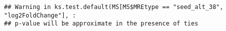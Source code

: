 \documentclass[
]{article}
\newenvironment{Shaded}{\begin{snugshade}}{\end{snugshade}}
\newcommand{\FunctionTok}[1]{\textcolor[rgb]{0.13,0.29,0.53}{\textbf{#1}}}
\newcommand{\NormalTok}[1]{#1}
\newcommand{\OtherTok}[1]{\textcolor[rgb]{0.56,0.35,0.01}{#1}}
\newcommand{\SpecialCharTok}[1]{\textcolor[rgb]{0.81,0.36,0.00}{\textbf{#1}}}
\newcommand{\StringTok}[1]{\textcolor[rgb]{0.31,0.60,0.02}{#1}}
\begin{document}
\begin{Shaded}
\end{Shaded}

\begin{verbatim}
## Warning in ks.test.default(MS[MS$MREtype == "seed_alt_38", "log2FoldChange"], :
## p-value will be approximate in the presence of ties
\end{verbatim}
\end{document}
